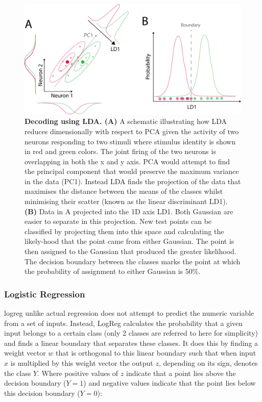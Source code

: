 \begin{figure}[!ht]
        \captionsetup{}
        \centering
        \includegraphics[width =  0.75\paperwidth]{Figures/R3_LDA_explaination.pdf}
       \caption[\label{fig:R3_F3} \textbf{Decoding using LDA}]{\label{fig:R3_F3} \textbf{Decoding using LDA. (A)} A schematic illustrating how LDA reduces dimensionally with respect to PCA given the activity of two neurons responding to two stimuli where stimulus identity is shown in red and green colors. The joint firing of the two neurons is overlapping in both the x and y axis. PCA would attempt to find the principal component that would preserve the maximum variance in the data (PC1). Instead LDA finds the projection of the data that maximises the distance between the means of the classes whilst minimising their scatter (known as the linear discriminant LD1). \textbf{(B)} Data in A projected into the 1D axis LD1. Both Gaussian are easier to separate in this projection. New test points can be classified by projecting them into this space and calculating the likely-hood that the point came from either Gaussian. The point is then assigned to the Gaussian that produced the greater likelihood. The decision boundary between the classes marks the point at which the probability of assignment to either Gaussian is 50\%.
    }
\end{figure}

\subsubsection{Logistic Regression}
\gls{logreg} unlike actual regression does not attempt to predict the numeric variable from a set of inputs. Instead, LogReg calculates the probability that a given input belongs to a certain class (only 2 classes are referred to here for simplicity) and finds a linear boundary that separates these classes. It does this by finding a weight vector $w$ that is orthogonal to this linear boundary such that when input $x$ is multiplied by this weight vector the output $z$, depending on its sign, denotes the class $Y$. Where positive values of $z$ indicate that a point lies above the decision boundary ($Y = 1$) and negative values indicate that the point lies below this decision boundary ($Y = 0$):

